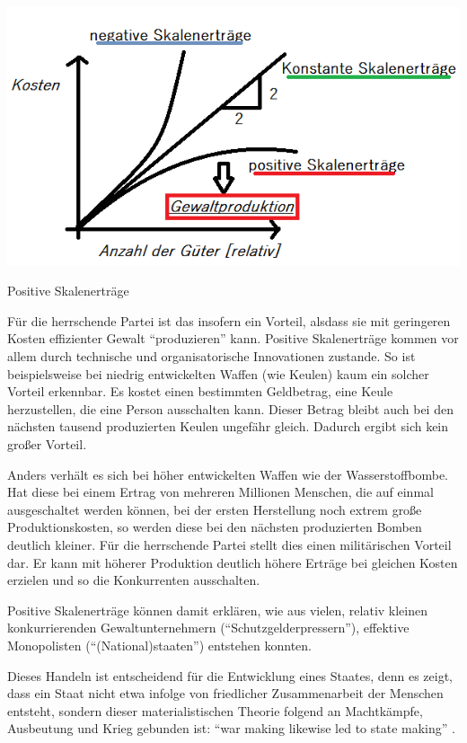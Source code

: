 \begin{dsafigure}
	\begin{center}
	\includegraphics[width=0.9\columnwidth]{img/Skalenertraege.png}
	\caption{Positive Skalenerträge}
	\label{fig:skalenertraege}
	\end{center}
\end{dsafigure}

Für die herrschende Partei ist das insofern ein Vorteil, alsdass sie mit geringeren Kosten effizienter Gewalt ``produzieren'' kann.
Positive Skalenerträge kommen vor allem durch technische und organisatorische Innovationen zustande.
So ist beispielsweise bei niedrig entwickelten Waffen (wie Keulen) kaum ein solcher Vorteil erkennbar.
Es kostet einen bestimmten Geldbetrag, eine Keule herzustellen, die eine Person ausschalten kann.
Dieser Betrag bleibt auch bei den nächsten tausend produzierten Keulen ungefähr gleich.
Dadurch ergibt sich kein großer Vorteil.

Anders verhält es sich bei höher entwickelten Waffen wie der Wasserstoffbombe.
Hat diese bei einem Ertrag von mehreren Millionen Menschen, die auf einmal ausgeschaltet werden können, bei der ersten Herstellung noch extrem große Produktionskosten, so werden diese bei den nächsten produzierten Bomben deutlich kleiner.
Für die herrschende Partei stellt dies einen militärischen Vorteil dar.
Er kann mit höherer Produktion deutlich höhere Erträge bei gleichen Kosten erzielen und so die Konkurrenten ausschalten.

Positive Skalenerträge können damit erklären, wie aus vielen, relativ kleinen konkurrierenden Gewaltunternehmern (``Schutzgelderpressern''), effektive Monopolisten (``(National)staaten'') entstehen konnten.

Dieses Handeln ist entscheidend für die Entwicklung eines Staates, denn es zeigt, dass ein Staat nicht etwa infolge von friedlicher Zusammenarbeit der Menschen entsteht, sondern dieser materialistischen Theorie folgend an Machtkämpfe, Ausbeutung und Krieg gebunden ist: ``war making likewise led to state making'' \parencite[183]{Tilly-1985-aa}.

